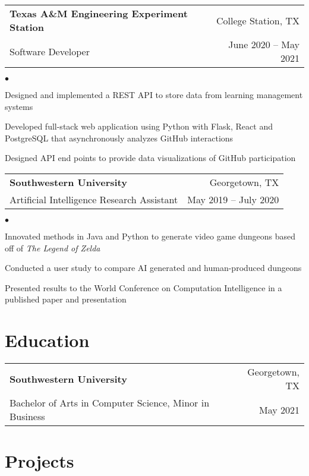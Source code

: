 \documentclass[margin, 11pt]{res}
\makeatletter
\newcommand{\resumeSubheading}[4]{

\begin{tabular*}{1.01\textwidth}{@{\hspace{-4pt}}l @{\extracolsep{\fill}} r}
\textbf{#1} & #2 \\
      {#3} &  {#4}
\end{tabular*}\vspace{-2pt}
}
\newcommand{\resumeSubSubheading}[2]{
\begin{tabular*}{1.01\textwidth}{@{\hspace{-4pt}}l @{\extracolsep{\fill}} r}
    #1 & #2 
\end{tabular*}\vspace{-7pt}
}
\newenvironment{list2}{
	\begin{list}{$\bullet$}{%
	    \small
		\setlength{\itemsep}{0in}
		\setlength{\parsep}{0in} \setlength{\parskip}{0in}
		\setlength{\topsep}{0in} \setlength{\partopsep}{0in}
		\setlength{\leftmargin}{0.2in}}}{\end{list}}
\makeatother
\begin{document}
\begin{resume}
\resumeSubheading{{\bf Texas A\&M Engineering Experiment Station}}{College Station, TX}
                 {Software Developer}{June 2020 -- May 2021}

\begin{list2}
\item{Designed and implemented a REST API to store data from learning management systems }
\item{Developed full-stack web application using Python with Flask, React and PostgreSQL that asynchronously analyzes GitHub interactions }
\item{Designed API end points to provide data visualizations of GitHub participation }
\end{list2}

\resumeSubheading{Southwestern University}{Georgetown, TX}
             {Artificial Intelligence Research Assistant}{May 2019 -- July 2020}

\begin{list2}
\item{Innovated methods in Java and Python to generate video game dungeons based off of \emph{The Legend of Zelda}}
\item{Conducted a user study to compare AI generated and human-produced dungeons}
\item{Presented results to the World Conference on Computation Intelligence in a published paper and presentation}
\end{list2}

\section{\sc Education}

\vspace{2pt}

\resumeSubheading{Southwestern University}{Georgetown, TX}
             {Bachelor of Arts in Computer Science, Minor in Business}{May 2021}

\section{\sc Projects}




\end{resume}
\end{document}
